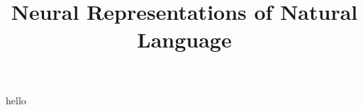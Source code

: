 \documentclass{tufte-book}
\title{Neural Representations of Natural Language}
\begin{document}
	
\frontmatter

\maketitle

hello



%
%
\end{document}
